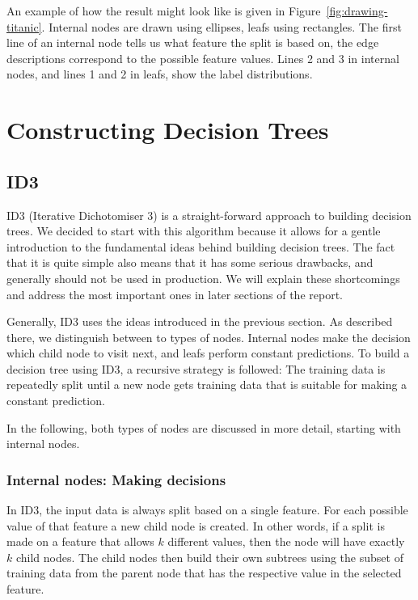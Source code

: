 \documentclass[a4paper]{article}
\begin{document}
An example of how the result might look like is given in Figure~\ref{fig:drawing-titanic}. Internal nodes are drawn using ellipses, leafs using rectangles. The first line of an internal node tells us what feature the split is based on, the edge descriptions correspond to the possible feature values. Lines 2 and 3 in internal nodes, and lines 1 and 2 in leafs, show the label distributions.

\section{Constructing Decision Trees}

\subsection{ID3}

ID3 (Iterative Dichotomiser 3) is a straight-forward approach to building decision trees. We decided to start with this algorithm because it allows for a gentle introduction to the fundamental ideas behind building decision trees.
The fact that it is quite simple also means that it has some serious drawbacks, and generally should not be used in production. We will explain these shortcomings and address the most important ones in later sections of the report.

Generally, ID3 uses the ideas introduced in the previous section.
As described there, we distinguish between to types of nodes. Internal nodes make the decision which child node to visit next, and leafs perform constant predictions.
To build a decision tree using ID3, a recursive strategy is followed: The training data is repeatedly split until a new node gets training data that is suitable for making a constant prediction.

In the following, both types of nodes are discussed in more detail, starting with internal nodes.

\subsubsection{Internal nodes: Making decisions}

In ID3, the input data is always split based on a single feature. For each possible value of that feature a new child node is created.
In other words, if a split is made on a feature that allows $k$ different values, then the node will have exactly $k$ child nodes.
The child nodes then build their own subtrees using the subset of training data from the parent node that has the respective value in the selected feature.
\end{document}

